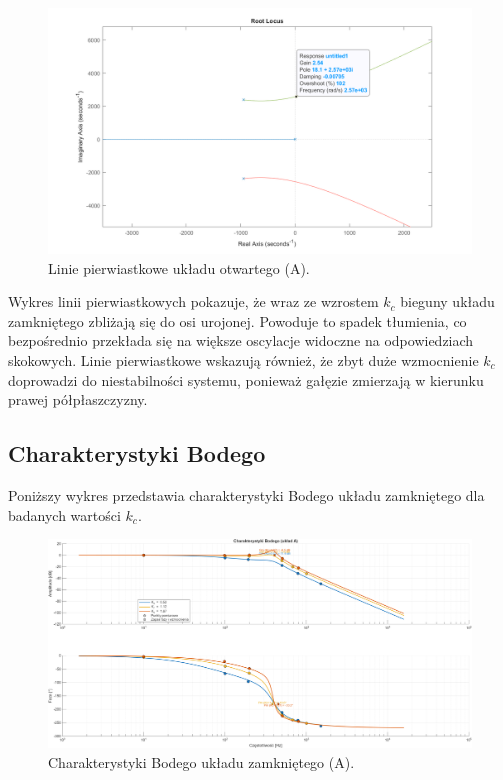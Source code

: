 \documentclass[12pt,a4paper]{article}
\begin{document}
	\begin{figure}[H]
		\centering
		\includegraphics[width=0.8\linewidth]{zdjecia/LP_ukladA.png}
		\caption{Linie pierwiastkowe układu otwartego (A).}
		\label{fig:LP_ukladA}
	\end{figure}
	
	Wykres linii pierwiastkowych pokazuje, że wraz ze wzrostem $k_c$ bieguny układu zamkniętego zbliżają się do osi urojonej. Powoduje to spadek tłumienia, co bezpośrednio przekłada się na większe oscylacje widoczne na odpowiedziach skokowych. Linie pierwiastkowe wskazują również, że zbyt duże wzmocnienie $k_c$ doprowadzi do niestabilności systemu, ponieważ gałęzie zmierzają w kierunku prawej półpłaszczyzny. 
	
	\subsection{Charakterystyki Bodego}
	Poniższy wykres przedstawia charakterystyki Bodego układu zamkniętego dla badanych wartości \(k_c\).
	
	\begin{figure}[H]
		\centering
		\includegraphics[width=1\linewidth]{zdjecia/Bode_ukladA.png}
		\caption{Charakterystyki Bodego układu zamkniętego (A).}
		\label{fig:Bode_ukladA}
	\end{figure}
	
\end{document}
